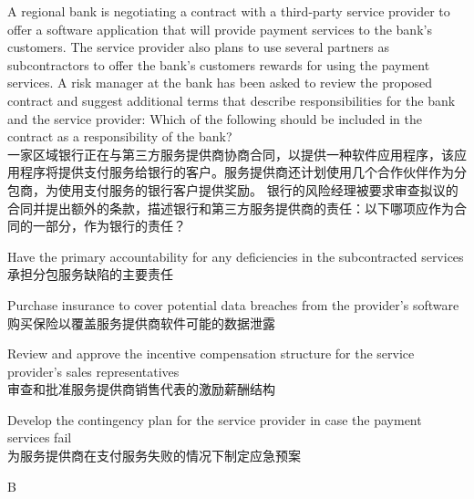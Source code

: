 \documentclass{article}
\newcounter{question} %
\begin{document}
\begin{question}
    A regional bank is negotiating a contract with a third-party service provider to offer a software application that will provide payment services to the bank's customers. The service provider also plans to use several partners as subcontractors to offer the bank's customers rewards for using the payment services.
    A risk manager at the bank has been asked to review the proposed contract and suggest additional terms that describe responsibilities for the bank and the service provider: Which of the following should be included in the contract as a responsibility of the bank?
    \\一家区域银行正在与第三方服务提供商协商合同，以提供一种软件应用程序，该应用程序将提供支付服务给银行的客户。服务提供商还计划使用几个合作伙伴作为分包商，为使用支付服务的银行客户提供奖励。
    银行的风险经理被要求审查拟议的合同并提出额外的条款，描述银行和第三方服务提供商的责任：以下哪项应作为合同的一部分，作为银行的责任？
\end{question}

\begin{choices}
    \item Have the primary accountability for any deficiencies in the subcontracted services\\
    承担分包服务缺陷的主要责任
    \item Purchase insurance to cover potential data breaches from the provider's software\\
    购买保险以覆盖服务提供商软件可能的数据泄露
    \item Review and approve the incentive compensation structure for the service provider's sales representatives\\
    审查和批准服务提供商销售代表的激励薪酬结构
    \item Develop the contingency plan for the service provider in case the payment services fail\\
    为服务提供商在支付服务失败的情况下制定应急预案
\end{choices}

\begin{correctanswer}
    B
\end{correctanswer}
\end{document}
